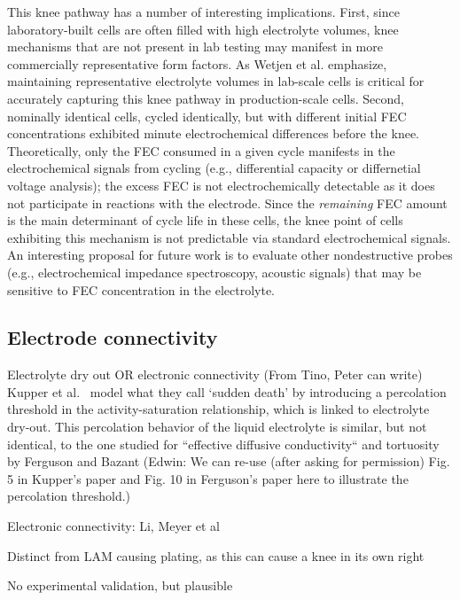 \documentclass{article}
\begin{document}
This knee pathway has a number of interesting implications.
First, since laboratory-built cells are often filled with high electrolyte volumes, knee mechanisms that are not present in lab testing may manifest in more commercially representative form factors.
As Wetjen et al.\cite{wetjen_differentiating_2017} emphasize,
maintaining representative electrolyte volumes in lab-scale cells is critical for accurately capturing this knee pathway in production-scale cells.
Second, nominally identical cells, cycled identically, but with different initial FEC concentrations exhibited minute electrochemical differences before the knee.\cite{jung_consumption_2016}
Theoretically, only the FEC consumed in a given cycle manifests in the electrochemical signals from cycling (e.g., differential capacity or differnetial voltage analysis); the excess FEC is not electrochemically detectable as it does not participate in reactions with the electrode.
Since the \emph{remaining} FEC amount is the main determinant of cycle life in these cells, the knee point of cells exhibiting this mechanism is not predictable via standard electrochemical signals.
An interesting proposal for future work is to evaluate other nondestructive probes (e.g., electrochemical impedance spectroscopy\cite{zhang_identifying_2020}, acoustic signals\cite{knehr_understanding_2018}) that may be sensitive to FEC concentration in the electrolyte.

\subsection{Electrode connectivity}

Electrolyte dry out OR electronic connectivity
(From Tino, Peter can write) Kupper et al.~\cite{kupper_end--life_2018} model what they call `sudden death' by introducing a percolation threshold in the activity-saturation relationship, which is linked to electrolyte dry-out. This percolation behavior of the liquid electrolyte is similar, but not identical, to the one studied for ``effective diffusive conductivity`` and tortuosity by Ferguson and Bazant (Edwin: We can re-use (after asking for permission) Fig. 5 in Kupper's paper and Fig. 10 in Ferguson's paper here to illustrate the percolation threshold.)

Electronic connectivity: Li, Meyer et al

Distinct from LAM causing plating, as this can cause a knee in its own right

No experimental validation, but plausible
\end{document}
